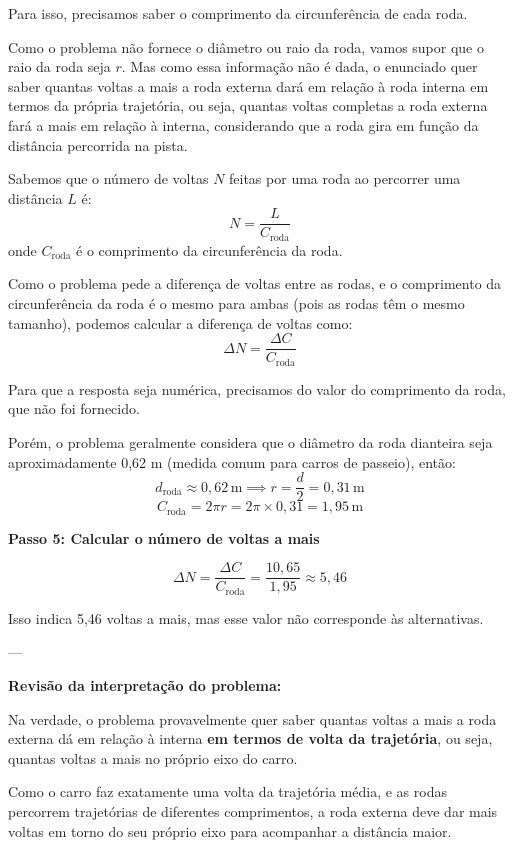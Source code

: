 \documentclass[a4paper,12pt]{article}
\begin{document}
\begin{flushleft}
Para isso, precisamos saber o comprimento da circunferência de cada roda.

Como o problema não fornece o diâmetro ou raio da roda, vamos supor que o raio da roda seja $r$. Mas como essa informação não é dada, o enunciado quer saber quantas voltas a mais a roda externa dará em relação à roda interna em termos da própria trajetória, ou seja, quantas voltas completas a roda externa fará a mais em relação à interna, considerando que a roda gira em função da distância percorrida na pista.

Sabemos que o número de voltas $N$ feitas por uma roda ao percorrer uma distância $L$ é:
\[
N = \frac{L}{C_{\text{roda}}}
\]
onde $C_{\text{roda}}$ é o comprimento da circunferência da roda.

Como o problema pede a diferença de voltas entre as rodas, e o comprimento da circunferência da roda é o mesmo para ambas (pois as rodas têm o mesmo tamanho), podemos calcular a diferença de voltas como:
\[
\Delta N = \frac{\Delta C}{C_{\text{roda}}}
\]

Para que a resposta seja numérica, precisamos do valor do comprimento da roda, que não foi fornecido.

Porém, o problema geralmente considera que o diâmetro da roda dianteira seja aproximadamente 0,62 m (medida comum para carros de passeio), então:
\[
d_{\text{roda}} \approx 0,62\,\text{m} \implies r = \frac{d}{2} = 0,31\,\text{m}
\]
\[
C_{\text{roda}} = 2 \pi r = 2 \pi \times 0,31 = 1,95\,\text{m}
\]

\bigskip

\textbf{Passo 5: Calcular o número de voltas a mais}

\[
\Delta N = \frac{\Delta C}{C_{\text{roda}}} = \frac{10,65}{1,95} \approx 5,46
\]

Isso indica 5,46 voltas a mais, mas esse valor não corresponde às alternativas.

---

\textbf{Revisão da interpretação do problema:}

Na verdade, o problema provavelmente quer saber quantas voltas a mais a roda externa dá em relação à interna \textbf{em termos de volta da trajetória}, ou seja, quantas voltas a mais no próprio eixo do carro.

Como o carro faz exatamente uma volta da trajetória média, e as rodas percorrem trajetórias de diferentes comprimentos, a roda externa deve dar mais voltas em torno do seu próprio eixo para acompanhar a distância maior.


\end{flushleft}
\end{document}
